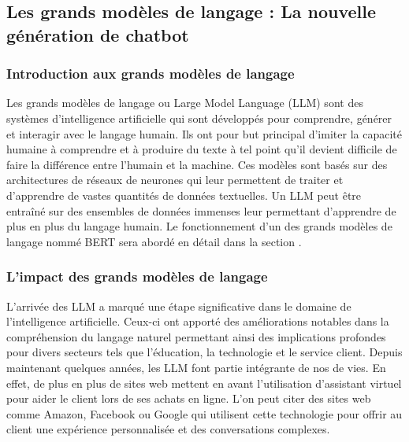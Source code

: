 \documentclass{rapport}
\begin{document}
\subsection{Les grands modèles de langage : La nouvelle génération de chatbot}
\subsubsection{Introduction aux grands modèles de langage}
Les grands modèles de langage ou Large Model Language (LLM) sont des systèmes d'intelligence artificielle qui sont développés pour comprendre, générer et interagir avec le langage humain. Ils ont pour but principal d'imiter la capacité humaine à comprendre et à produire du texte à tel point qu'il devient difficile de faire la différence entre l'humain et la machine. Ces modèles sont basés sur des architectures de réseaux de neurones qui leur permettent de traiter et d'apprendre de vastes quantités de données textuelles. Un LLM peut être entraîné sur des ensembles de données immenses leur permettant d'apprendre de plus en plus du langage humain. Le fonctionnement d'un des grands modèles de langage nommé BERT sera abordé en détail dans la section .

\subsubsection{L'impact des grands modèles de langage}
L'arrivée des LLM a marqué une étape significative dans le domaine de l'intelligence artificielle. Ceux-ci ont apporté des améliorations notables dans la compréhension du langage naturel permettant ainsi des implications profondes pour divers secteurs tels que l'éducation, la technologie et le service client. Depuis maintenant quelques années, les LLM font partie intégrante de nos de vies. En effet, de plus en plus de sites web mettent en avant l'utilisation d'assistant virtuel pour aider le client lors de ses achats en ligne. L'on peut citer des sites web comme Amazon, Facebook ou Google qui utilisent cette technologie pour offrir au client une expérience personnalisée  et des conversations complexes. 
\end{document}
